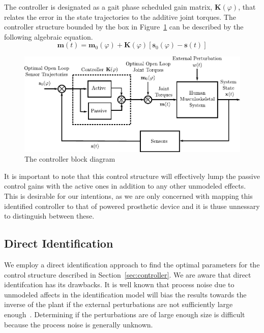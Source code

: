 \documentclass{article}
\newcommand{\K}{\mathbf{K}(\varphi)}
\begin{document}
The controller is designated as a gait phase scheduled gain matrix, $\K$, that
relates the error in the state trajectories to the additive joint torques. The
controller structure bounded by the box in Figure~\ref{fig:controller} can be
described by the following algebraic equation.
%
\begin{equation}
  \mathbf{m}(t) = \mathbf{m}_0(\varphi) + \mathbf{K}(\varphi) [\mathbf{s}_0(\varphi) - \mathbf{s}(t)]
  \label{eq:controller}
\end{equation}
%
\begin{figure}
  \centering
  \includegraphics{figures/control-system.pdf}
  \caption{The controller block diagram}
  \label{fig:controller}
\end{figure}

It is important to note that this control structure will effectively lump the
passive control gains with the active ones in addition to any other unmodeled
effects. This is desirable for our intentions, as we are only concerned with
mapping this identified controller to that of powered prosthetic device and it
is thuse unnessary to distinguish between these.

\subsection*{Direct Identification}
%
We employ a direct identification approach to find the optimal parameters for
the control structure described in Section~\ref{sec:controller}. We are aware
that direct identifcation has its drawbacks. It is well known that process
noise due to unmodeled affects in the identification model will bias the
results towards the inverse of the plant if the external perturbations are not
sufficiently large enough~\cite{Ljung1999,Kearney1990,Kooij2005}. Determining
if the perturbations are of large enough size is difficult because the process
noise is generally unknown.

\end{document}
